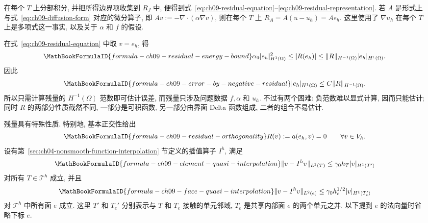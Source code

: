 \begin{Proof}
在每个 $T$ 上分部积分, 并把所得边界项收集到 $R_J$ 中, 便得到式~\eqref{eq:ch09-residual-equation}--\eqref{eq:ch09-residual-representation}. 若 $A$ 是形式上与式~\eqref{eq:ch09-diffusion-form} 对应的微分算子, 即 $Av:=-\nabla\cdot(\alpha\nabla v)$, 则在每个 $T$ 上 $R_A=A(u-u_h)=Ae_h$. 这里使用了 $\nabla u_h$ 在每个 $T$ 上是多项式这一事实, 以及关于 $\alpha$ 和 $f$ 的假设.
\end{Proof}

在式~\eqref{eq:ch09-residual-equation} 中取 $v=e_h$, 得
\begin{equation}
\MathBookFormulaID{formula-ch09-residual-energy-bound}
\label{eq:ch09-residual-energy-bound}
\alpha_0|e_h|_{H^1(\Omega)}^2
\leq|R(e_h)|
\leq\|R\|_{H^{-1}(\Omega)}|e_h|_{H^1(\Omega)}.
\end{equation}
因此
\begin{equation}
\MathBookFormulaID{formula-ch09-error-by-negative-residual}
\label{eq:ch09-error-by-negative-residual}
|e_h|_{H^1(\Omega)}\leq C\|R\|_{H^{-1}(\Omega)}.
\end{equation}
所以只需计算残量的 $H^{-1}(\Omega)$ 范数即可估计误差, 而残量只涉及问题数据 $f,\alpha$ 和 $u_h$. 不过有两个困难: 负范数难以显式计算, 因而只能估计; 同时 $R$ 的两部分性质截然不同, 一部分是可积函数, 另一部分由界面 Delta 函数组成, 二者的组合不易估计.

残量具有特殊性质. 特别地, 基本正交性给出
\begin{equation}
\MathBookFormulaID{formula-ch09-residual-orthogonality}
\label{eq:ch09-residual-orthogonality}
R(v):=a(e_h,v)=0
\qquad\forall v\in V_h.
\end{equation}
设有第~\ref{sec:ch04-nonsmooth-function-interpolation} 节定义的插值算子 $I^h$, 满足
\begin{equation}
\MathBookFormulaID{formula-ch09-element-quasi-interpolation}
\label{eq:ch09-element-quasi-interpolation}
\|v-I^hv\|_{L^2(T)}\leq\gamma_0h_T|v|_{H^1(T')}
\end{equation}
对所有 $T\in\mathcal T^h$ 成立, 并且
\begin{equation}
\MathBookFormulaID{formula-ch09-face-quasi-interpolation}
\label{eq:ch09-face-quasi-interpolation}
\|v-I^hv\|_{L^2(e)}\leq\gamma_0h_e^{1/2}|v|_{H^1(T_e')}
\end{equation}
对 $\mathcal T^h$ 中所有面 $e$ 成立. 这里 $T'$ 和 $T_e'$ 分别表示与 $T$ 和 $T_e$ 接触的单元邻域, $T_e$ 是共享内部面 $e$ 的两个单元之并. 以下提到 $e$ 的法向量时省略下标 $e$.

